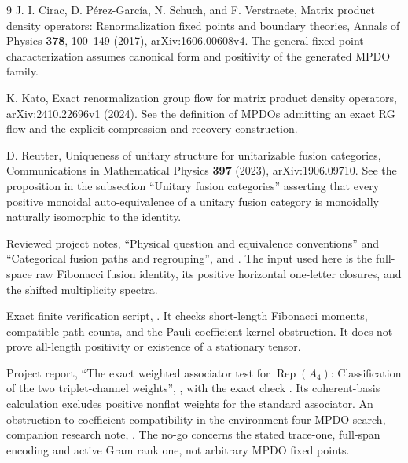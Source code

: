\begin{thebibliography}{9}
	J. I. Cirac, D. P\'erez-Garc\'ia, N. Schuch, and F. Verstraete,
	Matrix product density operators: Renormalization fixed points and
	boundary theories, Annals of Physics \textbf{378}, 100--149 (2017),
	arXiv:1606.00608v4.
	The general fixed-point characterization assumes canonical form
	and positivity of the generated MPDO family.

	K. Kato, Exact renormalization group flow for matrix product density
	operators, arXiv:2410.22696v1 (2024).
	See the definition of MPDOs admitting an exact RG flow and the
	explicit compression and recovery construction.

	D. Reutter, Uniqueness of unitary structure for unitarizable fusion
	categories, Communications in Mathematical Physics \textbf{397}
	(2023), arXiv:1906.09710.
	See the proposition in the subsection ``Unitary fusion categories''
	asserting that every positive monoidal auto-equivalence of a unitary
	fusion category is monoidally naturally isomorphic to the identity.

	Reviewed project notes, ``Physical question and equivalence conventions''
	and ``Categorical fusion paths and regrouping'',
	 and
	.
	The input used here is the full-space raw Fibonacci fusion identity,
	its positive horizontal one-letter closures, and the shifted
	multiplicity spectra.

	Exact finite verification script,
	.
	It checks short-length Fibonacci moments, compatible path counts,
	and the Pauli coefficient-kernel obstruction. It does not prove
	all-length positivity or existence of a stationary tensor.

	Project report, ``The exact weighted associator test for
	$\operatorname{Rep}(A_4)$: Classification of the two triplet-channel
	weights'',
	, with the exact check
	.
	Its coherent-basis calculation excludes positive nonflat weights
	for the standard associator.
An obstruction to coefficient compatibility in the environment-four
MPDO search, companion research note,
.
The no-go concerns the stated trace-one, full-span encoding and active
Gram rank one, not arbitrary MPDO fixed points.
\end{thebibliography}
